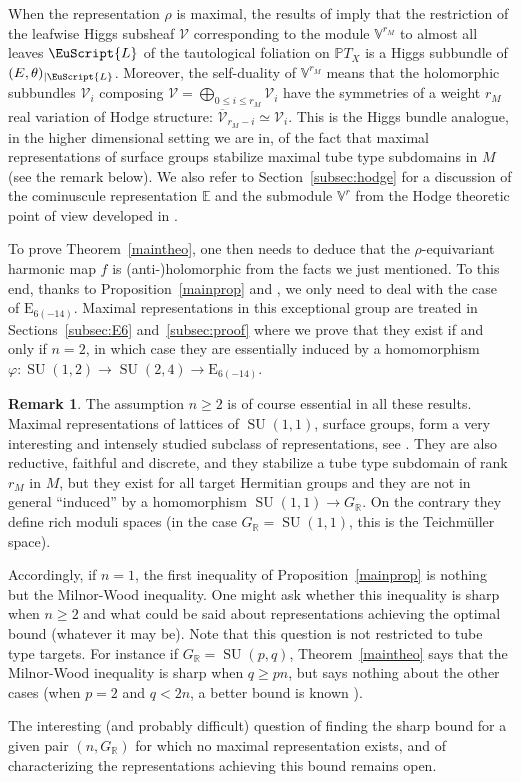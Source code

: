 \documentclass[JEP,XML,SOM,Unicode,NoFloatCountersInSection]{cedram}
\let\mathcal\mathscr
\let\cites\cite
\newcommand{\Leaf}{\EuScript{L}}
\theoremstyle{plain}
\theoremstyle{definition}
\newtheorem*{rema*}{Remark}
\let\ov\overline
\let\rgy r
\DeclareMathOperator{\SU}{SU}
\newcommand{\cV}{\mathcal{V}}
\newcommand{\bE}{\mathbb{E}}
\newcommand{\bV}{\mathbb{V}}
\newcommand{\bR}{\mathbb{R}}
\newcommand{\PTX}{{\mathbb{P}T_X}}
\newcommand{\Vr}{\mathbb{V}^\rgy}
\newcommand{\rkm}{{r_M}}
\begin{document}
When the representation $\rho$ is maximal, the results of \cite{KM} imply that the restric\-tion of the
leafwise Higgs subsheaf $\cV$ corresponding to the module $\bV^\rkm$
to almost all leaves $\Leaf$ of the tautological foliation on $\PTX$ is a Higgs subbundle of
$(E,\theta)_{|\Leaf}$. Moreover, the self-duality of $\bV^\rkm$ means that the
holomorphic subbundles $\cV_i$ composing $\cV=\bigoplus_{0\leq i\leq\rkm}\cV_i$ have the
symmetries of a weight $\rkm$ real variation of Hodge structure: $\ov{\cV}_{\rkm-i}\simeq\cV_i$.
This is the Higgs bundle analogue, in the higher dimensional setting we are in, of the fact that
maximal representations of surface groups stabilize maximal tube type subdomains in $M$ (see the
remark below). We also refer to Section~\ref{subsec:hodge} for a discussion of the cominuscule
representation $\bE$ and the submodule $\Vr$ from the Hodge theoretic point of view developed in \cites{Gross, ShengZuo}.

To prove Theorem~\ref{maintheo}, one then needs to deduce that the $\rho$-equivariant
harmonic map $f$ is (anti-)holomorphic from the facts we just mentioned. To this end, thanks to
Proposition~\ref{mainprop} and \cite{KM}, we only need to
deal with the case of $\mathrm{E}_{6 (-14)}$.
Maximal representations in this exceptional group are treated
in Sections~\ref{subsec:E6} and~\ref{subsec:proof} where we prove that they exist if and
only if $n=2$, in which case they are
essentially induced by a homomorphism $ \varphi: \SU(1,2)\to\SU(2,4)\to \mathrm{E}_{6 (-14)}$.

\begin{rema*}\label{ngeq2}
The assumption $n\geq 2$ is of course essential in all these results. Maximal representations of
lattices of $\SU(1,1)$, \ie surface groups, form a very interesting
and intensely studied subclass
of representations, see \eg \cites{Hernandez,Xia00,MarkmanXia, BGPG1, BGPG2,
BIW10,GuichardWienhard}. They are also reductive, faithful and discrete, and they
stabilize a tube type subdomain of rank $\rkm$ in $M$, but
they exist for all target Hermitian groups and they are not in
general ``induced'' by a homomorphism $\SU(1,1)\to G_\bR$. On the contrary they define rich moduli
spaces (in the case $G_\bR=\SU(1,1)$, this is the Teichmüller space).

Accordingly, if $n=1$, the first inequality of Proposition~\ref{mainprop} is nothing but the
Milnor-Wood inequality.
One might ask whether this inequality is sharp when $n\geq 2$ and what could be said about representations
achieving the optimal bound (whatever it may be). Note that this question is not restricted to tube
type targets. For instance if $G_\bR=\SU(p,q)$, Theorem~\ref{maintheo} says that the Milnor-Wood
inequality is sharp when $q \geq pn$, but says nothing about the
other cases (when $p=2$
and $q<2n$, a better bound is known \cite{KMrank2}).

The interesting (and probably difficult) question of finding the sharp bound for a given pair
$(n,G_\bR)$
for which no maximal representation exists, and of characterizing the
representations achieving this bound remains open.
\end{rema*}
\end{document}

